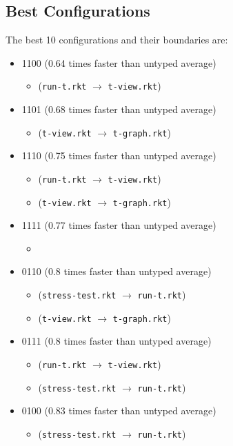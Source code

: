 \documentclass{article}
\newcommand{\mono}[1]{\texttt{#1}}
\begin{document}
\subsection{Best Configurations}
The best 10 configurations and their boundaries are:
\begin{itemize}
\item 1100 (0.64 times faster than untyped average)
  \begin{itemize}
  \item (\mono{run-t.rkt} $\rightarrow$ \mono{t-view.rkt})
  \end{itemize}
\item 1101 (0.68 times faster than untyped average)
  \begin{itemize}
  \item (\mono{t-view.rkt} $\rightarrow$ \mono{t-graph.rkt})
  \end{itemize}
\item 1110 (0.75 times faster than untyped average)
  \begin{itemize}
  \item (\mono{run-t.rkt} $\rightarrow$ \mono{t-view.rkt})
  \item (\mono{t-view.rkt} $\rightarrow$ \mono{t-graph.rkt})
  \end{itemize}
\item 1111 (0.77 times faster than untyped average)
  \begin{itemize}
  \item 
  \end{itemize}
\item 0110 (0.8 times faster than untyped average)
  \begin{itemize}
  \item (\mono{stress-test.rkt} $\rightarrow$ \mono{run-t.rkt})
  \item (\mono{t-view.rkt} $\rightarrow$ \mono{t-graph.rkt})
  \end{itemize}
\item 0111 (0.8 times faster than untyped average)
  \begin{itemize}
  \item (\mono{run-t.rkt} $\rightarrow$ \mono{t-view.rkt})
  \item (\mono{stress-test.rkt} $\rightarrow$ \mono{run-t.rkt})
  \end{itemize}
\item 0100 (0.83 times faster than untyped average)
  \begin{itemize}
  \item (\mono{stress-test.rkt} $\rightarrow$ \mono{run-t.rkt})

\end{itemize}
\end{itemize}
\end{document}
